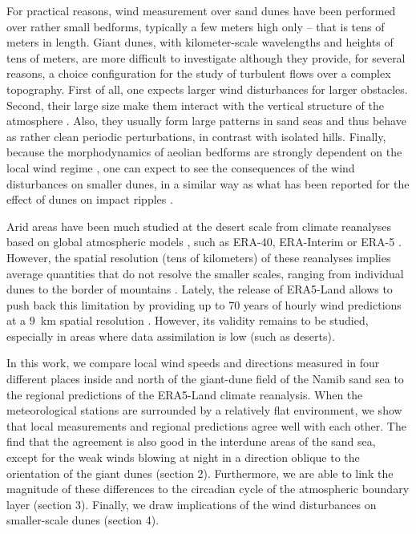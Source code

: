 For practical reasons, wind measurement over sand dunes have been performed over rather small bedforms, typically a few meters high only -- that is tens of meters in length. Giant dunes, with kilometer-scale wavelengths and heights of tens of meters, are more difficult to investigate although they provide, for several reasons, a choice configuration for the study of turbulent flows over a complex topography. First of all, one expects larger wind disturbances for larger obstacles. Second, their large size make them interact with the vertical structure of the atmosphere \citep{andreotti2009}. Also, they usually form large patterns in sand seas and thus behave as rather clean periodic perturbations, in contrast with isolated hills. Finally, because the morphodynamics of aeolian bedforms are strongly dependent on the local wind regime \citep{Livingstone1996}, one can expect to see the consequences of the wind disturbances on smaller dunes, in a similar way as what has been reported for the effect of dunes on impact ripples \citep{Howard1977,Hood2021}.

Arid areas have been much studied at the desert scale from climate reanalyses based on global atmospheric models \citep{Blumberg1996, Livingstone2010, Ashkenazy2012, Jolivet2021, Hu2021}, such as ERA-40, ERA-Interim or ERA-5 \citep{Uppala2005, Dee2011, Hersbach2020}. However, the spatial resolution (tens of kilometers) of these reanalyses implies average quantities that do not resolve the smaller scales, ranging from individual dunes to the border of mountains \citep{Livingstone2010}. Lately, the release of ERA5-Land allows to push back this limitation by providing up to 70 years of hourly wind predictions at a $9$~km spatial resolution \citep{munoz2021}. However, its validity remains to be studied, especially in areas where data assimilation is low (such as deserts).

In this work, we compare local wind speeds and directions measured in four different places inside and north of the giant-dune field of the Namib sand sea to the regional predictions of the ERA5-Land climate reanalysis. When the meteorological stations are surrounded by a relatively flat environment, we show that local measurements and regional predictions agree well with each other. The find that the agreement is also good in the interdune areas of the sand sea, except for the weak winds blowing at night in a direction oblique to the orientation of the giant dunes (section 2). Furthermore, we are able to link the magnitude of these differences to the circadian cycle of the atmospheric boundary layer (section 3). Finally, we draw implications of the wind disturbances on smaller-scale dunes (section 4).


